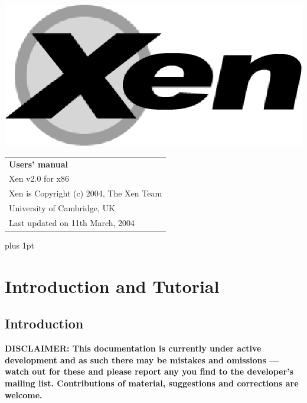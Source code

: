 \documentclass[11pt,twoside,final,openright]{xenstyle}
\begin{document}
\pagestyle{empty}
\begin{center}
\vspace*{\fill}
\includegraphics{eps/xenlogo.eps}
\vfill
\vfill
\vfill
\begin{tabular}{l}
{\Huge \bf Users' manual} \\[4mm]
{\huge Xen v2.0 for x86} \\[80mm]

{\Large Xen is Copyright (c) 2004, The Xen Team} \\[3mm]
{\Large University of Cambridge, UK} \\[20mm]
{\large Last updated on 11th March, 2004}
\end{tabular}
\vfill
\end{center}
\cleardoublepage

\pagestyle{plain}
{ \parskip 0pt plus 1pt
  \tableofcontents }
\cleardoublepage

\raggedbottom
{}
\parindent=0pt
\renewcommand{\topfraction}{.8}
\renewcommand{\bottomfraction}{.8}
\renewcommand{\textfraction}{.2}
\renewcommand{\floatpagefraction}{.8}

\newcommand{\path}[1]{{\tt #1}}

\part{Introduction and Tutorial}
\chapter{Introduction}

{\bf
DISCLAIMER: This documentation is currently under active development
and as such there may be mistakes and omissions --- watch out for
these and please report any you find to the developer's mailing list.
Contributions of material, suggestions and corrections are welcome.
}
\end{document}
